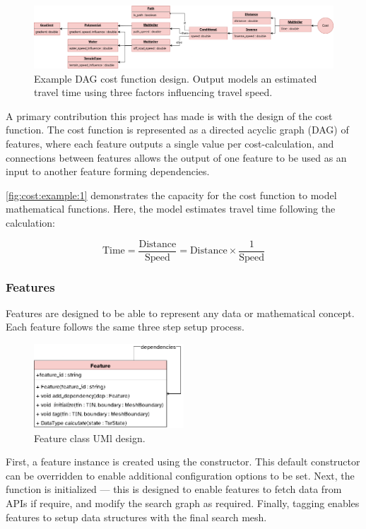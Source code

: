 \documentclass[12pt]{article}
\begin{document}
\begin{figure}[!htbp]
  \centering
  \includegraphics[width=\textwidth]{assets/costfunction_example1.png}
  \caption{Example DAG cost function design. Output models an estimated travel time using three factors influencing travel speed.}\label{fig:cost:example:1}
\end{figure}

A primary contribution this project has made is with the design of the cost function. The cost function is represented as a directed acyclic graph (DAG) of features, where each feature outputs a single value per cost-calculation, and connections between features allows the output of one feature to be used as an input to another feature forming dependencies.


\autoref{fig:cost:example:1} demonstrates the capacity for the cost function to model mathematical functions. Here, the model estimates travel time following the calculation:

\[\text{Time} = \frac{\text{Distance}}{\text{Speed}} = \text{Distance} \times \frac{1}{\text{Speed}}\]

\subsubsection{Features}

Features are designed to be able to represent any data or mathematical concept. Each feature follows the same three step setup process.

\begin{figure}[!htbp]
  \includegraphics[width=0.5\textwidth]{assets/feature.png}
  \centering
  \caption{Feature class UMl design.}\label{fig:feature}
\end{figure}

First, a feature instance is created using the constructor. This default constructor can be overridden to enable additional configuration options to be set. Next, the function is initialized --- this is designed to enable features to fetch data from APIs if require, and modify the search graph as required. Finally, tagging enables features to setup data structures with the final search mesh.
\end{document}
